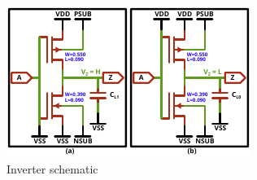 
\begin{figure}[h]
	\centering
	\includegraphics[width=\columnwidth]{./figures/IVX4.pdf}
	\caption{Inverter schematic}
	\label{ivxbufmos}
\end{figure}
